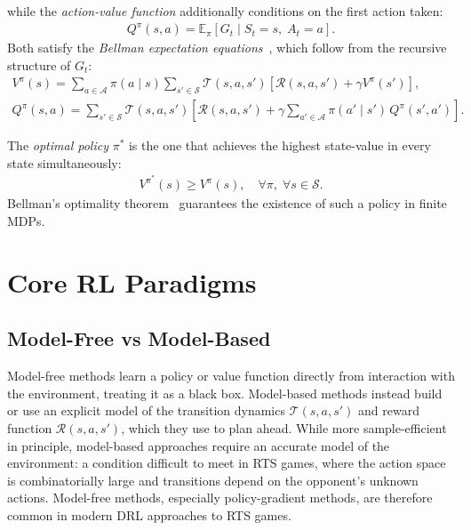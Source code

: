 while the \emph{action-value function} additionally conditions on the first action taken:
\begin{align}
Q^\pi(s,a) = \mathbb{E}_\pi\!\left[ G_t \mid S_t = s,\; A_t = a \right].
\end{align}
Both satisfy the \emph{Bellman expectation equations}~\cite{bellmanDynamicProgramming1957}, which follow from the recursive structure of $G_t$:
\begin{align}
V^\pi(s) = \sum_{a \in \mathcal{A}} \pi(a \mid s) \sum_{s' \in \mathcal{S}} \mathcal{T}(s, a, s') \left[ \mathcal{R}(s, a, s') + \gamma V^\pi(s') \right], \label{eq:bellman_v} \\[6pt]
Q^\pi(s,a) = \sum_{s' \in \mathcal{S}} \mathcal{T}(s, a, s') \left[ \mathcal{R}(s, a, s') + \gamma \sum_{a' \in \mathcal{A}} \pi(a' \mid s')\, Q^\pi(s', a') \right]. \label{eq:bellman_q}
\end{align}

The \emph{optimal policy} $\pi^*$ is the one that achieves the highest state-value in every state simultaneously:
\begin{align}
V^{\pi^*}(s) \geq V^\pi(s), \quad \forall \pi, \; \forall s \in \mathcal{S}.
\end{align}
Bellman's optimality theorem~\cite{bellmanDynamicProgramming1957} guarantees the existence of such a policy in finite MDPs.

\section{Core RL Paradigms}

\subsection{Model-Free vs Model-Based}

Model-free methods learn a policy or value function directly from interaction with the environment, treating it as a black box. Model-based methods instead build or use an explicit model of the transition dynamics $\mathcal{T}(s,a,s')$ and reward function $\mathcal{R}(s,a,s')$, which they use to plan ahead. While more sample-efficient in principle, model-based approaches require an accurate model of the environment: a condition difficult to meet in RTS games, where the action space is combinatorially large and transitions depend on the opponent's unknown actions. Model-free methods, especially policy-gradient methods, are therefore common in modern DRL approaches to RTS games.

